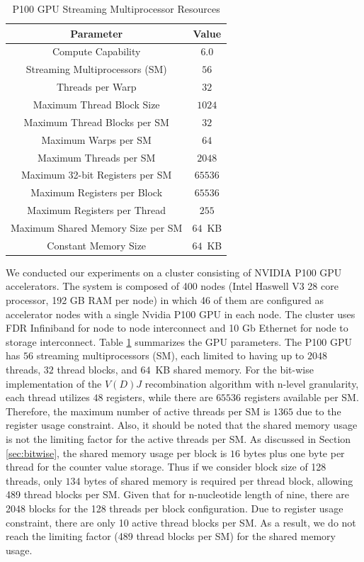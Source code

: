 \begin{table}
\caption{P100 GPU Streaming Multiprocessor Resources}
\renewcommand{\arraystretch}{1.2}
\begin{center}
\begin{tabular}{ |c|c| }
  \hline
    \textbf{Parameter} & \textbf{Value} \\ \hline
    Compute Capability & $6.0$ \\
    Streaming Multiprocessors (SM) & $56$ \\
    Threads per Warp & $32$  \\
    Maximum Thread Block Size & $1024$ \\
    Maximum Thread Blocks per SM & $32$ \\
    Maximum Warps per SM & $64$  \\
    Maximum Threads per SM & $2048$ \\
    Maximum 32-bit Registers per SM & $65536$ \\
    Maximum Registers per Block & $65536$ \\
    Maximum Registers per Thread & $255$ \\
    Maximum Shared Memory Size per SM & $64$~KB \\
    Constant Memory Size & $64$~KB \\
    \hline
\end{tabular}
  \label{tab:P100params}
\end{center}
\end{table}

We conducted our experiments on a cluster consisting of NVIDIA P100 GPU accelerators. The system is composed of 400 nodes (Intel Haswell V3 28 core processor, 192 GB RAM per node) in which 46 of them are configured as accelerator nodes with a single Nvidia P100 GPU in each node. The cluster uses FDR Infiniband for node to node interconnect and 10 Gb Ethernet for node to storage interconnect. Table \ref{tab:P100params} summarizes the GPU parameters. The P100 GPU has $56$ streaming multiprocessors (SM), each limited to having up to $2048$ threads, $32$ thread blocks, and $64$~KB shared memory. For the bit-wise implementation of the $V(D)J$ recombination algorithm with n-level granularity, each thread utilizes $48$ registers, while there are $65536$ registers available per SM. Therefore, the maximum number of active threads per SM is $1365$ due to the register usage constraint.
Also, it should be noted that the shared memory usage is not the limiting factor for the active threads per SM. As discussed in Section \ref{sec:bitwise}, the shared memory usage per block is $16$ bytes plus one byte per thread for the counter value storage. Thus if we consider block size of 128 threads, only $134$ bytes of shared memory is required per thread block, allowing 489 thread blocks per SM. Given that for n-nucleotide length of nine, there are 2048 blocks for the 128 threads per block configuration. Due to register usage constraint, there are only 10 active thread blocks per SM. As a result, we do not reach the limiting factor (489 thread blocks per SM) for the shared memory usage.

